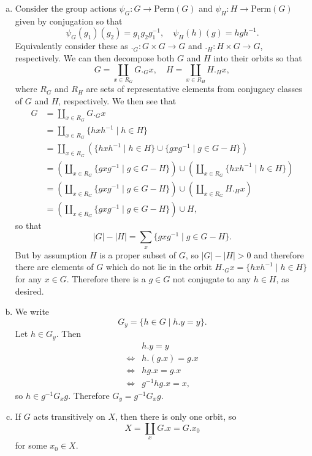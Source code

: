 \documentclass{article}
\begin{document}
\begin{Answer}
  \begin{enumerate}[(a)]
    \item{
      Consider the group actions
      $\psi_G : G \to \mathrm{Perm}(G)$ and
      $\psi_H : H \to \mathrm{Perm}(G)$ given by conjugation
      so that
      $$
      \psi_G(g_1)(g_2) = g_1 g_2 g_1^{-1}, \quad
      \psi_H(h)(g) = h g h^{-1}.
      $$
      Equivalently consider these as
      $._G : G \times G \to G$ and $._H : H \times G \to G$, respectively.
      We can then decompose both $G$ and $H$ into their orbits so that
      $$
      G = \coprod_{x \in R_G} G ._G x, \quad
      H = \coprod_{x \in R_H} H ._H x,
      $$
      where $R_G$ and $R_H$ are sets of representative elements from
      conjugacy classes of $G$ and $H$, respectively.
      We then see that
      \begin{align*}
        G &= \coprod_{x \in R_G} G ._G x \\
          &= \coprod_{x \in R_G} \{ h x h^{-1} \mid h \in H \} \\
          &= \coprod_{x \in R_G} \left(
               \{ h x h^{-1} \mid h \in H \}
               \cup
               \{ g x g^{-1} \mid g \in G - H \}
             \right) \\
          &= \left(\coprod_{x \in R_G}
               \{ g x g^{-1} \mid g \in G - H \}
             \right)
             \cup
             \left(\coprod_{x \in R_G}
               \{ h x h^{-1} \mid h \in H \}
             \right) \\
          &= \left(\coprod_{x \in R_G}
               \{ g x g^{-1} \mid g \in G - H \}
             \right)
             \cup
             \left(\coprod_{x \in R_G}
               H ._H x
             \right) \\
          &= \left(\coprod_{x \in R_G}
               \{ g x g^{-1} \mid g \in G - H \}
             \right)
             \cup H,
      \end{align*}
      so that
      $$
      |G| - |H| = \sum_{x} \{ g x g^{-1} \mid g \in G - H \}.
      $$
      But by assumption $H$ is a proper subset of $G$, so
      $|G| - |H| > 0$ and therefore there are elements
      of $G$ which do not lie in the
      orbit $H ._G x = \{ h x h^{-1} \mid h \in H \}$ for any
      $x \in G$. Therefore there is a $g \in G$
      not conjugate to any $h \in H$, as desired.
    }
    \item{
      We write
      $$
      G_y = \{ h \in G \mid h . y = y \}.
      $$
      Let $h \in G_y$. Then
      \begin{align*}
           & h . y = y \\
      \iff & h . (g . x) = g . x \\
      \iff & h g . x = g . x \\
      \iff & g^{-1} h g . x = x,
      \end{align*}
      so $h \in g^{-1} G_x g$. Therefore $G_y = g^{-1} G_x g$.
    }
    \item{
      If $G$ acts transitively on $X$, then there is only one orbit,
      so
      $$
      X = \coprod_x G . x = G . x_0
      $$
      for some $x_0 \in X$.

}
\end{enumerate}
\end{Answer}
\end{document}
